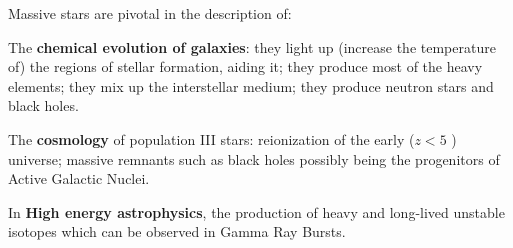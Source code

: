 \documentclass[main.tex]{subfiles}
\begin{document}


Massive stars are pivotal in the description of: 

The \textbf{chemical evolution of galaxies}: they light up (increase the temperature of) the regions of stellar formation, aiding it; they produce most of the heavy elements; they mix up the interstellar medium; they produce neutron stars and black holes.

The \textbf{cosmology} of population III stars: 
reionization of the early (\(z < 5\) ) universe; 
massive remnants such as black holes possibly being the progenitors of Active Galactic Nuclei.

In \textbf{High energy astrophysics}, the production of heavy and long-lived unstable isotopes which can be observed in Gamma Ray Bursts.

\end{document}
